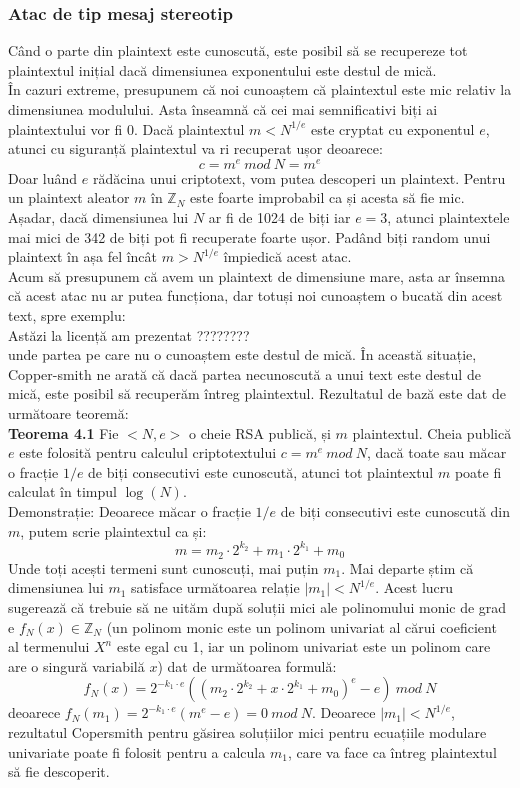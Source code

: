 \documentclass[12pt, oneside]{book}
\begin{document}
\subsubsection{Atac de tip mesaj stereotip}
Când o parte din plaintext este cunoscută, este posibil să se recupereze tot plaintextul inițial dacă dimensiunea exponentului este destul de mică. \\
În cazuri extreme, presupunem că noi cunoaștem că plaintextul este mic relativ la dimensiunea modulului. Asta înseamnă că cei mai semnificativi biți ai plaintextului vor fi 0. Dacă plaintextul $m < N^{1/e}$ este cryptat cu exponentul $e$, atunci cu siguranță plaintextul va ri recuperat ușor deoarece:
$$ c = m^e \ mod \ N = m^e$$
Doar luând $e$ rădăcina unui criptotext, vom putea descoperi un plaintext. Pentru un plaintext aleator $m$ în $\mathbb{Z}_N$ este foarte improbabil ca și acesta să fie mic. \\
Așadar, dacă dimensiunea lui $N$ ar fi de 1024 de biți iar $e=3$, atunci plaintextele mai mici de 342 de biți pot fi recuperate foarte ușor. Padând biți random unui plaintext în așa fel încât $m > N^{1/e}$ împiedică acest atac. \\
Acum să presupunem că avem un plaintext de dimensiune mare, asta ar însemna că acest atac nu ar putea funcționa, dar totuși noi cunoaștem o bucată din acest text, spre exemplu: \\
Astăzi la licență am prezentat ???????? \\
unde partea pe care nu o cunoaștem este destul de mică. În această situație, Copper-smith \cite{cooper} \cite{cooper2} ne arată că dacă partea necunoscută a unui text este destul de mică, este posibil să recuperăm întreg plaintextul. Rezultatul de bază este dat de următoare teoremă: \\
\textbf{Teorema 4.1}
Fie $<N,e>$ o cheie RSA publică, și $m$ plaintextul. Cheia publică $e$ este folosită pentru calculul criptotextului $c = m^e \ mod \ N$, dacă toate sau măcar o fracție $1/e$ de biți consecutivi este cunoscută, atunci tot plaintextul $m$ poate fi calculat în timpul $\log(N)$. \\
Demonstrație: Deoarece măcar o fracție $1/e$ de biți consecutivi este cunoscută din $m$, putem scrie plaintextul ca și:
$$ m= m_{2}^{} \cdot   2^{k_2} + m_1 \cdot   2^{k_1} + m_0$$
Unde toți acești termeni sunt cunoscuți, mai puțin $m_1$. Mai departe știm  că dimensiunea lui $m_1$ satisface următoarea relație $ |m_1| < N^{1/e}$. Acest lucru sugerează că trebuie să ne uităm după soluții mici ale polinomului monic de grad e $f_N(x) \in \mathbb{Z}_N $ (un polinom monic este un polinom univariat al cărui coeficient al termenului $X^n$ este egal cu 1, iar un polinom univariat este un polinom care are o singură variabilă $x$) dat de următoarea formulă:
$$ f_N(x) = 2^{-k_1 \cdot   e}((m_2 \cdot   2^{k_2} + x \cdot 2^{k_1} + m_0)^e - e) \ mod \ N$$
deoarece $f_N(m_1)= 2^{-k_1  \cdot e}(m^e-e)=0 \ mod \ N$. Deoarece $ |m_1| < N^{1/e}$, rezultatul Copersmith pentru găsirea soluțiilor mici pentru ecuațiile modulare univariate poate fi folosit pentru a calcula $m_1$, care va face ca întreg plaintextul să fie descoperit. 
\end{document}
